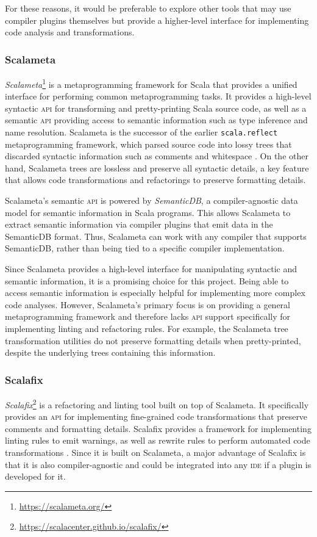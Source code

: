 For these reasons, it would be preferable to explore other tools that may use compiler plugins themselves but provide a higher-level interface for implementing code analysis and transformations.

\subsubsection{Scalameta}
\textit{Scalameta}\footnote{\url{https://scalameta.org/}} is a metaprogramming framework for Scala that provides a unified interface for performing common metaprogramming tasks.
It provides a high-level syntactic \textsc{api} for transforming and pretty-printing Scala source code, as well as a semantic \textsc{api} providing access to semantic information such as type inference and name resolution.
Scalameta is the successor of the earlier \texttt{scala.reflect} metaprogramming framework, which parsed source code into lossy trees that discarded syntactic information such as comments and whitespace \cite{burmako_scalameta_2017}.
On the other hand, Scalameta trees are lossless and preserve all syntactic details, a key feature that allows code transformations and refactorings to preserve formatting details.

Scalameta's semantic \textsc{api} is powered by \textit{SemanticDB}, a compiler-agnostic data model for semantic information in Scala programs.
This allows Scalameta to extract semantic information via compiler plugins that emit data in the SemanticDB format.
Thus, Scalameta can work with any compiler that supports SemanticDB, rather than being tied to a specific compiler implementation.

Since Scalameta provides a high-level interface for manipulating syntactic and semantic information, it is a promising choice for this project.
Being able to access semantic information is especially helpful for implementing more complex code analyses.
However, Scalameta's primary focus is on providing a general metaprogramming framework and therefore lacks \textsc{api} support specifically for implementing linting and refactoring rules.
For example, the Scalameta tree transformation utilities do not preserve formatting details when pretty-printed, despite the underlying trees containing this information.

\subsubsection{Scalafix}
\textit{Scalafix}\footnote{\url{https://scalacenter.github.io/scalafix/}} is a refactoring and linting tool built on top of Scalameta.
It specifically provides an \textsc{api} for implementing fine-grained code transformations that preserve comments and formatting details.
Scalafix provides a framework for implementing linting rules to emit warnings, as well as rewrite rules to perform automated code transformations \cite{geirsson_catch_2017}.
Since it is built on Scalameta, a major advantage of Scalafix is that it is also compiler-agnostic and could be integrated into any \textsc{ide} if a plugin is developed for it.

